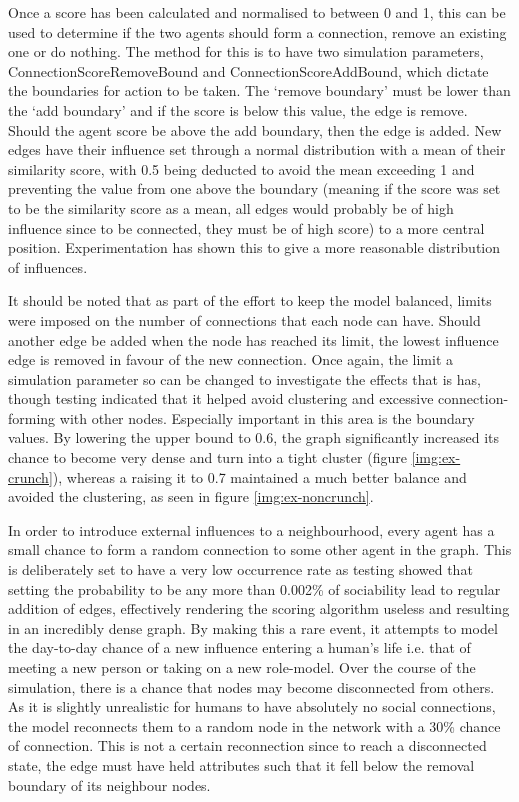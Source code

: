 \documentclass[]{report}
\begin{document}
Once a score has been calculated and normalised to between 0 and 1, this can be used to determine if the two agents should form a connection, remove an existing one or do nothing. The method for this is to have two simulation parameters, ConnectionScoreRemoveBound and ConnectionScoreAddBound, which dictate the boundaries for action to be taken. The `remove boundary’ must be lower than the `add boundary’ and if the score is below this value, the edge is remove. Should the agent score be above the add boundary, then the edge is added. New edges have their influence set through a normal distribution with a mean of their similarity score, with 0.5 being deducted to avoid the mean exceeding 1 and preventing the value from one above the boundary (meaning if the score was set to be the similarity score as a mean, all edges would probably be of high influence since to be connected, they must be of high score) to a more central position. Experimentation has shown this to give a more reasonable distribution of influences.

It should be noted that as part of the effort to keep the model balanced, limits were imposed on the number of connections that each node can have. Should another edge be added when the node has reached its limit, the lowest influence edge is removed in favour of the new connection. Once again, the limit a simulation parameter so can be changed to investigate the effects that is has, though testing indicated that it helped avoid clustering and excessive connection-forming with other nodes. Especially important in this area is the boundary values. By lowering the upper bound to 0.6, the graph significantly increased its chance to become very dense and turn into a tight cluster  (figure \ref{img:ex-crunch}), whereas a raising it to 0.7 maintained a much better balance and avoided the clustering, as seen in figure \ref{img:ex-noncrunch}.

In order to introduce external influences to a neighbourhood, every agent has a small chance to form a random connection to some other agent in the graph. This is deliberately set to have a very low occurrence rate as testing showed that setting the probability to be any more than 0.002\% of sociability lead to regular addition of edges, effectively rendering the scoring algorithm useless and resulting in an incredibly dense graph. By making this a rare event, it attempts to model the day-to-day chance of a new influence entering a human's life i.e. that of meeting a new person or taking on a new role-model. Over the course of the simulation, there is a chance that nodes may become disconnected from others. As it is slightly unrealistic for humans to have absolutely no social connections, the model reconnects them to a random node in the network with a 30\% chance of connection. This is not a certain reconnection since to reach a disconnected state, the edge must have held attributes such that it fell below the removal boundary of its neighbour nodes.
\end{document}
